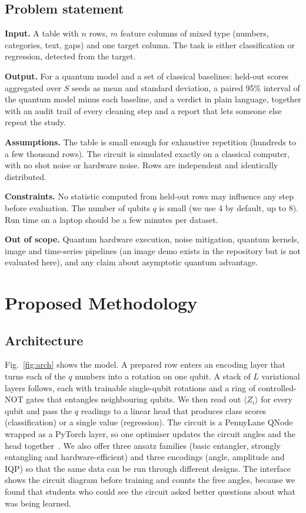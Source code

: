 \documentclass[conference]{IEEEtran}
\begin{document}
\subsection{Problem statement}
\textbf{Input.} A table with $n$ rows, $m$ feature columns of mixed type (numbers, categories, text, gaps) and one target column. The task is either classification or regression, detected from the target.

\textbf{Output.} For a quantum model and a set of classical baselines: held-out scores aggregated over $S$ seeds as mean and standard deviation, a paired 95\% interval of the quantum model minus each baseline, and a verdict in plain language, together with an audit trail of every cleaning step and a report that lets someone else repeat the study.

\textbf{Assumptions.} The table is small enough for exhaustive repetition (hundreds to a few thousand rows). The circuit is simulated exactly on a classical computer, with no shot noise or hardware noise. Rows are independent and identically distributed.

\textbf{Constraints.} No statistic computed from held-out rows may influence any step before evaluation. The number of qubits $q$ is small (we use 4 by default, up to 8). Run time on a laptop should be a few minutes per dataset.

\textbf{Out of scope.} Quantum hardware execution, noise mitigation, quantum kernels, image and time-series pipelines (an image demo exists in the repository but is not evaluated here), and any claim about asymptotic quantum advantage.

\section{Proposed Methodology}
\subsection{Architecture}
Fig.~\ref{fig:arch} shows the model. A prepared row enters an encoding layer that turns each of the $q$ numbers into a rotation on one qubit. A stack of $L$ variational layers follows, each with trainable single-qubit rotations and a ring of controlled-NOT gates that entangles neighbouring qubits. We then read out $\langle Z_i\rangle$ for every qubit and pass the $q$ readings to a linear head that produces class scores (classification) or a single value (regression). The circuit is a PennyLane QNode wrapped as a PyTorch layer, so one optimiser updates the circuit angles and the head together~\cite{bergholm2018pennylane,paszke2019pytorch}. We also offer three ansatz families (basic entangler, strongly entangling and hardware-efficient) and three encodings (angle, amplitude and IQP) so that the same data can be run through different designs. The interface shows the circuit diagram before training and counts the free angles, because we found that students who could see the circuit asked better questions about what was being learned.
\end{document}
